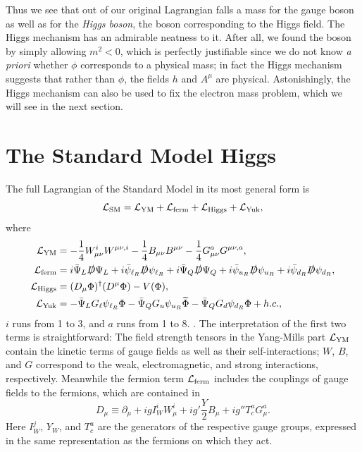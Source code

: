 Thus we see that out of our original Lagrangian falls a mass for the gauge
boson as well as for the {\it Higgs boson}, the boson corresponding to the
Higgs field. The Higgs mechanism has an admirable neatness to it. After all,
we found the boson by simply allowing $m^2<0$, which is perfectly justifiable
since we do not know {\it a priori} whether $\phi$ corresponds to a physical 
mass; in fact the Higgs mechanism suggests that rather than $\phi$, the
fields $h$ and $A^{\mu}$ are physical. Astonishingly, the Higgs mechanism
can also be used to fix the electron mass problem, which we will see in the
next section.

\section{The Standard Model Higgs}
The full Lagrangian of the Standard Model in its most general form is
\begin{equation}
  \label{eq:LSM}
  \mathcal{L}_{\rm SM}=\mathcal{L}_{\rm YM}+\mathcal{L}_{\rm ferm}+\mathcal{L}_{\rm Higgs}
                               +\mathcal{L}_{\rm Yuk},
\end{equation}
where
\begin{equation}
  \label{eq:Ldefs}
  \begin{aligned}
    \mathcal{L}_{\rm YM}&=-\frac{1}{4}W_{\mu\nu}^iW^{\mu\nu,i}
                -\frac{1}{4}B_{\mu\nu}B^{\mu\nu}
                -\frac{1}{4}G_{\mu\nu}^aG^{\mu\nu,a}, \\
    \mathcal{L}_{\rm ferm}&= i\bar{\Psi}_{L}\slashed{D}\Psi_{L}
                  +i\bar{\psi}_{\ell_R}\slashed{D}\psi_{\ell_R}
                  +i\bar{\Psi}_{Q}\slashed{D}\Psi_{Q}
                  +i\bar{\psi}_{u_R}\slashed{D}\psi_{u_R}
                  +i\bar{\psi}_{d_R}\slashed{D}\psi_{d_R}, \\
    \mathcal{L}_{\rm Higgs}&=(D_{\mu}\Phi)^{\dagger}(D^{\mu}\Phi)-V(\Phi), \\
    \mathcal{L}_{\rm Yuk}&=-\bar{\Psi}_{L}G_{\ell}\psi_{\ell_R}\Phi
                 -\bar{\Psi}_{Q}G_{u}\psi_{u_R}\widetilde{\Phi}
                 -\bar{\Psi}_{Q}G_{d}\psi_{d_R}\Phi+h.c.,
  \end{aligned}
\end{equation}
$i$ runs from 1 to 3, and $a$ runs from 1 to 8. \cite{dittmaier_higgs_2013}. 
The interpretation 
of the first two terms is straightforward: The field strength 
tensors in the Yang-Mills part $\mathcal{L}_{\rm YM}$ contain the 
kinetic terms of gauge 
fields as well as their self-interactions; $W$, $B$, and $G$ correspond to the 
weak, electromagnetic, and strong interactions, respectively. Meanwhile the 
fermion term $\mathcal{L}_{\rm ferm}$ includes the couplings of gauge fields to the 
fermions, which are contained in
\begin{equation}
  D_{\mu}\equiv\partial_{\mu}+igI_{W}^{i}W_{\mu}^{i}
                  +ig'\frac{Y}{2}B_{\mu}+ig''T_{c}^{a}G_{\mu}^{a}.
\end{equation}
Here $I_{W}^{j}$, $Y_{W}$, and $T_c^{a}$ are the generators of the respective 
gauge groups, expressed in the same representation as the fermions on which 
they act.

